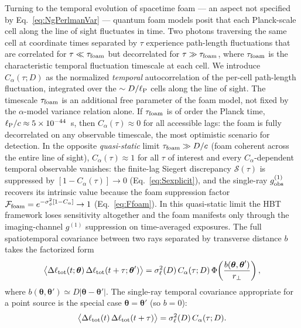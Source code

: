 \documentclass[aps,prd,onecolumn,amsmath,amssymb]{revtex4-2}
\begin{document}
Turning to the temporal evolution of spacetime foam --- an aspect not specified by Eq.~\eqref{eq:NgPerlmanVar} --- quantum foam models posit that each Planck-scale cell along the line of sight fluctuates in time.
Two photons traversing the same cell at coordinate times separated by $\tau$
experience path-length fluctuations that are correlated for $\tau \ll \tau_{\rm foam}$
but decorrelated for $\tau \gg \tau_{\rm foam}$, where $\tau_{\rm foam}$ is the
characteristic temporal fluctuation timescale at each cell.
We introduce $C_\alpha(\tau;D)$ as the normalized \emph{temporal} autocorrelation
of the per-cell path-length fluctuation, integrated over the $\sim D/\ell_{\rm P}$
cells along the line of sight.
The timescale $\tau_{\rm foam}$ is an additional free parameter of the foam model,
not fixed by the $\alpha$-model variance relation alone.
If $\tau_{\rm foam}$ is of order the Planck time,
$\ell_{\rm P}/c \approx 5\times10^{-44}$~s, then $C_\alpha(\tau) \approx 0$ for all
accessible lags: the foam is fully decorrelated on any observable timescale, the most
optimistic scenario for detection.
In the opposite \emph{quasi-static} limit $\tau_{\rm foam} \gg D/c$ (foam coherent
across the entire line of sight), $C_\alpha(\tau) \approx 1$ for all $\tau$ of
interest and every $C_\alpha$-dependent temporal observable vanishes:
the
finite-lag Siegert discrepancy $\mathcal{S}(\tau)$ is suppressed by
$[1-C_\alpha(\tau)] \to 0$ (Eq.~\eqref{eq:Sexplicit}), and the
single-ray $g^{(1)}_{\rm obs}$ recovers its intrinsic value because the
foam suppression factor
$\mathcal{F}_{\rm foam} = e^{-\sigma_\phi^2[1-C_\alpha]} \to 1$
(Eq.~\eqref{eq:Ffoam}).  In this quasi-static limit the HBT framework
loses sensitivity altogether and the foam manifests only through the
imaging-channel $g^{(1)}$ suppression on time-averaged exposures.
The full spatiotemporal covariance between two rays separated by transverse
distance $b$ takes the factorized form
\begin{equation}
  \big\langle \Delta\ell_{\rm tot}(t;\boldsymbol{\theta})\,
              \Delta\ell_{\rm tot}(t+\tau;\boldsymbol{\theta}')\big\rangle
  = \sigma_\ell^2(D)\,C_\alpha(\tau;D)\,
    \Phi\!\left(\frac{b(\boldsymbol{\theta},\boldsymbol{\theta}')}{r_\perp}\right),
  \label{eq:pathcov}
\end{equation}
where $b(\boldsymbol{\theta},\boldsymbol{\theta}') \simeq D|\boldsymbol{\theta}-\boldsymbol{\theta}'|$.
The single-ray temporal covariance appropriate for a
point source is the special case
$\boldsymbol{\theta}=\boldsymbol{\theta}'$ (so $b=0$):
\begin{equation}
  \big\langle \Delta\ell_{\rm tot}(t)\,
              \Delta\ell_{\rm tot}(t+\tau) \big\rangle
  = \sigma_\ell^2(D)\,C_\alpha(\tau;D).
  \label{eq:pathcov1ray}
\end{equation}
\end{document}

